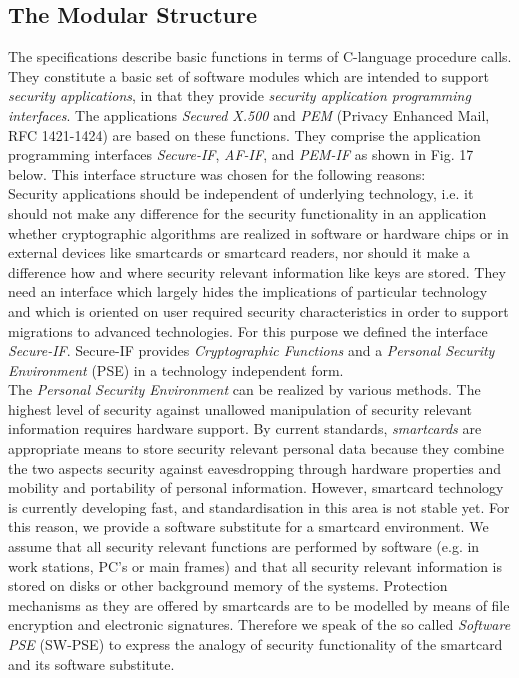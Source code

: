 \subsection{The Modular Structure}
\label{isw-sm}

The specifications describe basic functions in terms of C-language
procedure calls. They constitute a basic set of software modules
which are intended to support {\em security applications},
in that they provide {\em security application programming interfaces}.
The applications {\em Secured X.500} and {\em PEM} (Privacy Enhanced Mail, RFC 1421-1424)
are based on these functions. They comprise the
application programming interfaces {\em Secure-IF},
{\em AF-IF}, and {\em PEM-IF} as shown in Fig. 17 below.
This interface structure was chosen for the following reasons: \\ [1ex]
Security applications should be independent of underlying technology, i.e. it should
not make any difference for the security functionality in an application whether 
cryptographic algorithms are realized
in software or hardware chips or in external devices like smartcards or smartcard readers,
nor should it make a difference how and where security relevant information like keys 
are stored. They need an interface which largely hides the implications of particular
technology and which is oriented on user required security characteristics
in order to support migrations to advanced technologies. For this purpose
we defined the interface {\em Secure-IF}.
Secure-IF provides {\em Cryptographic Functions} 
and a {\em Personal Security Environment} (PSE) in a technology independent form. \\ [1ex]
The {\em Personal Security Environment} can be realized by various methods. The highest level of
security against unallowed manipulation of security relevant information requires
hardware support. By current standards, {\em smartcards} are appropriate means to
store security relevant personal data because they combine the two aspects
\bi
\m security against eavesdropping through hardware properties and
\m mobility and portability of personal information.
\ei
However, smartcard technology
is currently developing fast, and standardisation in this area is not stable
yet. For this reason, we provide a software substitute for a smartcard environment. 
We assume that all security relevant functions are
performed by software (e.g. in work stations, PC's or main frames) and that all
security relevant information is stored on disks or other background memory
of the systems. Protection mechanisms as they are offered by smartcards are to
be modelled by means of file encryption and electronic signatures. Therefore
we speak of the so called {\em Software PSE} (SW-PSE) to express the analogy of 
security functionality of the smartcard and its software substitute. 

